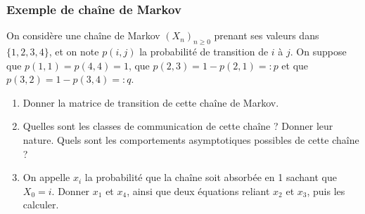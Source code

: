 \subsubsection{Exemple de chaîne de Markov}

  On considère une chaîne de Markov $(X_n)_{n \geq 0}$ prenant ses valeurs dans $\{1, 2, 3, 4\}$, et on note $p(i, j)$ la probabilité de transition de $i$ à $j$. On suppose que $p(1, 1) = p(4, 4) = 1$, que $p(2, 3) = 1 - p(2, 1) =: p$ et que $p(3, 2) = 1 - p(3, 4) =: q$.
  \begin{enumerate}
   \item Donner la matrice de transition de cette chaîne de Markov.
   \item Quelles sont les classes de communication de cette chaîne ? Donner leur nature. Quels sont les comportements asymptotiques possibles de cette chaîne ?
   \item On appelle $x_i$ la probabilité que la chaîne soit absorbée en 1 sachant que $X_0 = i$. Donner $x_1$ et $x_4$, ainsi que deux équations reliant $x_2$ et $x_3$, puis les calculer.
  \end{enumerate}

